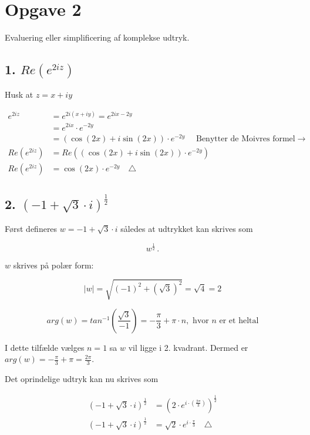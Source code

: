 \documentclass[a4paper, 12pt]{article}
\begin{document}
\section*{Opgave 2}
\label{sec:org3ea0d48}

Evaluering eller simplificering af komplekse udtryk.

\subsection*{1. \(Re\left(e^{2iz}\right)\)}
\label{sec:org4cf14bf}

Husk at \(z=x+iy\)

\begin{align*}
    e^{2i z} &= e^{2i (x+iy)} = e^{2ix -2y}\\
             &= e^{2ix} \cdot e^{-2y} \\
             &= \left(\cos(2x) + i\sin(2x)\right) \cdot e^{-2y} \quad \text{ Benytter de Moivres formel} \to \\
    Re\left(e^{2iz}\right) &= Re\left(\left(\cos(2x) + i\sin(2x)\right) \cdot e^{-2y} \right) \\
    Re\left(e^{2iz}\right) &= \cos(2x) \cdot e^{-2y}  \quad \triangle
\end{align*}

\subsection*{2. \(\left(-1 + \sqrt{3} \cdot i\right)^{\frac{1}{2}}\)}
\label{sec:orgab8f00d}

Først defineres \(w=-1 +\sqrt{3} \cdot i\) således at udtrykket kan skrives som

$$w^{\frac{1}{2}}\,.$$

\(w\) skrives på polær form:

$$|w| = \sqrt{(-1)^2+\left(\sqrt{3}\right)^2} = \sqrt{4} = 2$$

$$arg(w) = tan^{-1} \left(\frac{\sqrt{3}}{-1}\right) = - \frac{\pi}{3} + \pi \cdot n, \text{ hvor $n$ er et heltal}$$

I dette tilfælde vælges \(n=1\) sa \(w\) vil ligge i 2. kvadrant. Dermed er \(arg(w) = -\frac{\pi}{3}+\pi = \frac{2\pi}{3}\).

Det oprindelige udtryk kan nu skrives som

\begin{align*}
 \left(-1 + \sqrt{3} \cdot i\right)^{\frac{1}{2}} &= \left(2 \cdot e^{i\cdot \left( \frac{2\pi}{3} \right)}\right)^{\frac{1}{2}} \\
 \left(-1 + \sqrt{3} \cdot i\right)^{\frac{1}{2}} &= \sqrt{2} \cdot e^{i\cdot  \frac{\pi}{3} } \quad \triangle
\end{align*}
\end{document}
